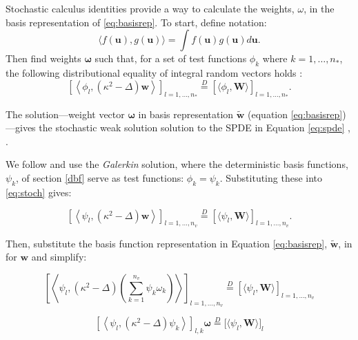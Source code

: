 Stochastic calculus identities provide a way to calculate the weights, $\omega$, in the basis representation of \ref{eq:basisrep}. To start, define notation: 
$$\langle f(\pmb{u}), g(\pmb{u}) \rangle = \int f(\pmb{u}) g(\pmb{u}) d\pmb{u}.$$ 
Then find weights $\pmb{\omega}$ such that, for a set of test functions $\phi_{k}$ where $k = 1, \dots, n_{*}$, the following distributional equality of integral random vectors holds \citep{Lindgren2011}:
\begin{equation}  \label{eq:stoch} %
\left[ \left< \phi_{l}, (\kappa^{2} - \Delta) \pmb{w} \right> \right]_{l = 1, \hdots, n_{*}} 
\overset{D}{=}
\left[ \langle \phi_{l}, \pmb{W} \rangle \right]_{l = 1, \hdots, n_{*}}.
\end{equation}

The solution---weight vector $\pmb{\omega}$ in basis representation $\widetilde{\pmb{w}}$ (equation \ref{eq:basisrep})---gives the stochastic weak solution solution to the SPDE in Equation \ref{eq:spde} \citep{Mao2007}, \citep{Lindstrom2014}. 

We follow \cite{Lindgren2011} and use the {\it Galerkin} solution, where the deterministic basis functions, $\psi_{k}$,  of section \ref{dbf} serve as test functions: $\phi_{k} = \psi_{k}$. Substituting these into \ref{eq:stoch} gives:

\begin{equation} \label{eq:stoch2} %
\left[ \left< \psi_{l}, (\kappa^{2} - \Delta) \pmb{w} \right> \right]_{l = 1, \hdots, n_{v}} 
\overset{D}{=}
\left[ \langle \psi_{l}, \pmb{W} \rangle \right]_{l = 1, \hdots, n_{v}}.
\end{equation}

Then, substitute the basis function representation in Equation \ref{eq:basisrep}, $\widetilde{\pmb{w}}$, in for $\pmb{w}$ and simplify:


$$ \left[ \left< \psi_{l}, (\kappa^{2} - \Delta) \left( \sum_{k=1}^{n_{v}} \psi_{k}\omega_{k} \right) \right> \right]_{l = 1, \hdots, n_{v}} 
\overset{D}{=}
\left[ \langle \psi_{l}, \pmb{W} \rangle \right]_{l = 1, \hdots, n_{v}} $$

$$ \left[ \left< \psi_{l}, (\kappa^{2} - \Delta) \psi_{k} \right> \right]_{l,k} \pmb{\omega} 
\overset{D}{=} 
\Big[ \langle \psi_{l}, \pmb{W} \rangle \Big]_{l} $$ 

